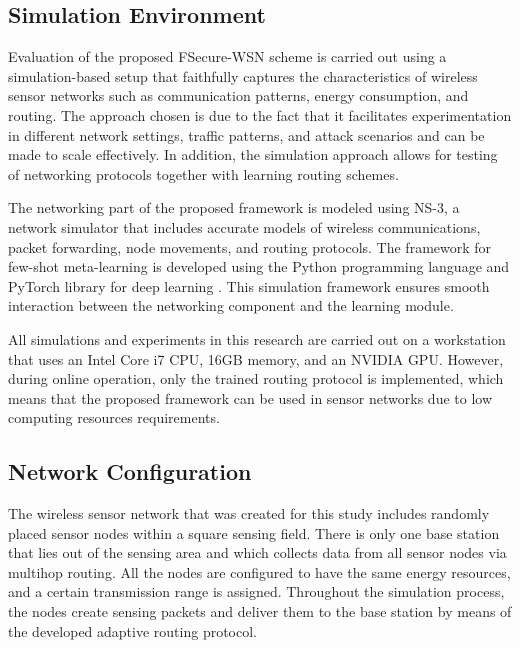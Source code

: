 \documentclass[pdflatex,sn-mathphys-num]{sn-jnl}
\begin{document}
\subsection{Simulation Environment}

Evaluation of the proposed FSecure-WSN scheme is carried out using a simulation-based setup that faithfully captures the characteristics of wireless sensor networks such as communication patterns, energy consumption, and routing. The approach chosen is due to the fact that it facilitates experimentation in different network settings, traffic patterns, and attack scenarios and can be made to scale effectively. In addition, the simulation approach allows for testing of networking protocols together with learning routing schemes.

The networking part of the proposed framework is modeled using NS-3, a network simulator that includes accurate models of wireless communications, packet forwarding, node movements, and routing protocols. The framework for few-shot meta-learning is developed using the Python programming language and PyTorch library for deep learning \cite{paszke2019pytorch}. This simulation framework ensures smooth interaction between the networking component and the learning module.

All simulations and experiments in this research are carried out on a workstation that uses an Intel Core i7 CPU, 16GB memory, and an NVIDIA GPU. However, during online operation, only the trained routing protocol is implemented, which means that the proposed framework can be used in sensor networks due to low computing resources requirements.


\subsection{Network Configuration}

The wireless sensor network that was created for this study includes randomly placed sensor nodes within a square sensing field. There is only one base station that lies out of the sensing area and which collects data from all sensor nodes via multihop routing. All the nodes are configured to have the same energy resources, and a certain transmission range is assigned. Throughout the simulation process, the nodes create sensing packets and deliver them to the base station by means of the developed adaptive routing protocol.
\end{document}
